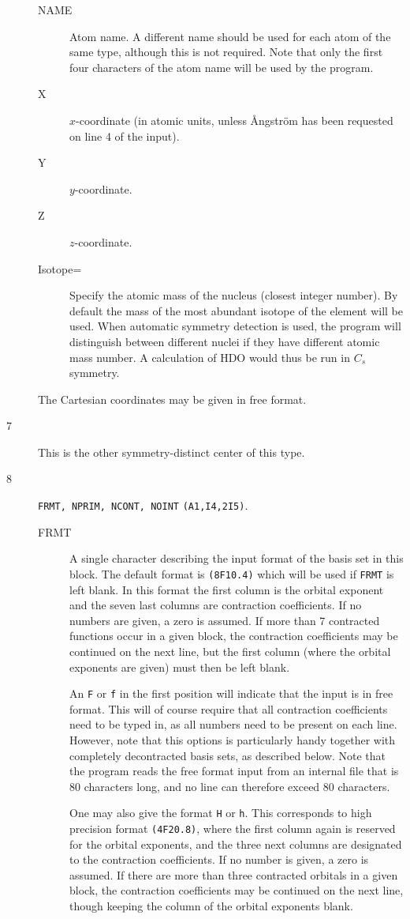 \begin{description}
\begin{description}
\item[NAME] Atom name.  A different name should be used for
each atom of the same type, although this is not required. Note that
only the first four characters of the atom name will be used by the
program.
\item[X] $x$-coordinate (in atomic units, unless \AA ngstr\"{o}m
has been requested on line 4 of the input).
\item[Y] $y$-coordinate.
\item[Z] $z$-coordinate.
\item[Isotope=]  Specify the atomic mass of the nucleus (closest
  integer number). By default the mass of the most abundant isotope
  of the element will be used. When automatic symmetry detection is
  used, the program will distinguish between different nuclei if they
  have different atomic mass number. A calculation of HDO would thus
  be run in $C_s$ symmetry. 
\end{description}
The Cartesian coordinates may
be given in free format.
\item[7] This is the other symmetry-distinct center of this type.
\item[8] \verb|FRMT, NPRIM, NCONT, NOINT| {\tt (A1,I4,2I5)}.
\begin{description}
\item[FRMT] A single character describing the input format of the
basis set in this block. The default format is {\tt (8F10.4)} which
will be used if {\tt FRMT} is left blank. In this format
the first column is the orbital exponent and the seven last columns
are contraction coefficients. If no numbers are given, a zero is
assumed. If more than 7 contracted functions occur in a given block,
the contraction coefficients may be continued on the next line, but
the first column (where the orbital exponents are given) must then be
left blank.

An {\tt F} or {\tt f} in the first position will indicate that the
input is in free format. This will of course require that all
contraction coefficients need to be typed in, as all numbers need
to be present on each line. However, note that this options is
particularly handy together with completely decontracted basis
sets, as described below. Note that the program reads the free
format input from an internal file that is 80 characters long, and
no line can therefore exceed 80 characters.

One may also give the format {\tt H} or {\tt h}. This corresponds to
high precision format {\tt (4F20.8)}, where the first column again is
reserved for the orbital exponents, and the three next columns are
designated to the contraction coefficients. If no number is given, a zero
is assumed. If there are more than three contracted orbitals in a
given block, the contraction coefficients may be continued on the next
line, though keeping the column of the orbital exponents blank.


\end{description}
\end{description}
